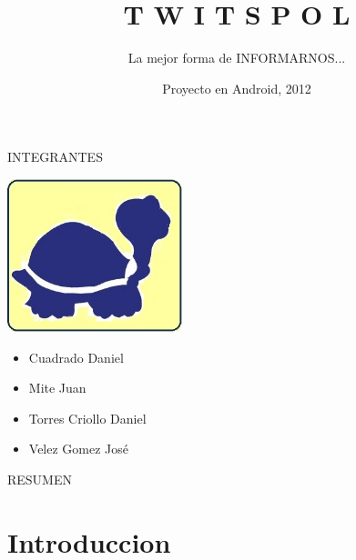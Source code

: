 \documentclass{beamer}
\title[PROYECTO - ANDROID] 
{T W I T S P O L}
\subtitle
{La mejor forma de INFORMARNOS...}
\institute[ESCUELA SUPERIOR]
{	
	ESCUELA SUPERIOR\\
	POLITECNICA DEL LITORAL
}
\date[CFP 2012]{Proyecto en Android, 2012}
\begin{document}
	\begin{frame}
  	  \titlepage
	\end{frame}
	
	\begin{frame}{INTEGRANTES}
		 \begin{flushleft}
 			\includegraphics[totalheight=1.2in,width=2in]{LTwitspol}
 		 \end{flushleft}
 		 
 		 \begin{itemize}
 		 	\item
 		 		\begin{flushright}
 		 			Cuadrado Daniel
 		 		\end{flushright}
 		 	\item
 		 		\begin{flushright}
 		 			Mite Juan 
 		 		\end{flushright}
 		 	\item
				\begin{flushright} 		 		
 		 		Torres Criollo Daniel
 		 		\end{flushright}
 		 	\item
 		 		\begin{flushright}
 		 			Velez Gomez José
 		 		\end{flushright}
 		 \end{itemize}
  	\end{frame}
  	
	\begin{frame}{RESUMEN}
 		 \tableofcontents
  	\end{frame}
  	
  	\section{Introduccion}
\end{document}
